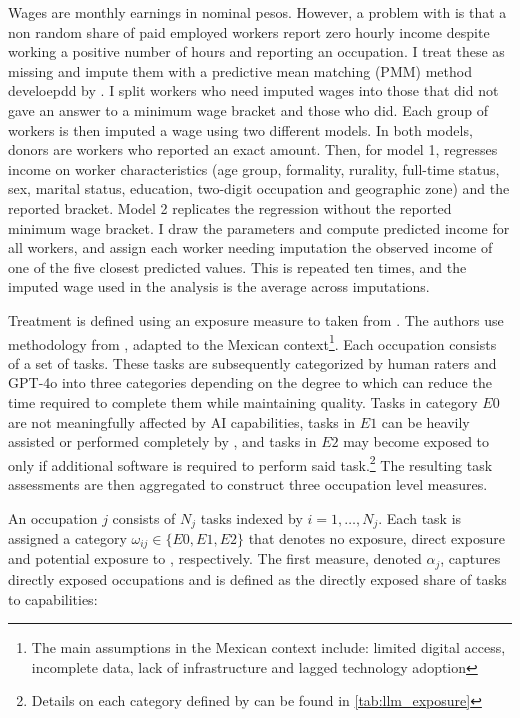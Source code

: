 Wages are monthly earnings in nominal pesos. However, a problem with  is that a non random share of paid employed workers report zero hourly income despite working a positive number of hours and reporting an occupation. \cite{imput}
I treat these as missing and impute them with a predictive mean matching (PMM) method develoepdd by \cite{conasami2023imputacion}. I split workers who need imputed wages into those that did not gave an answer to a minimum wage bracket and those who did. Each group of workers is then imputed a wage using two different models. In both models, donors are workers who reported an exact amount. Then, for model 1, regresses income on worker characteristics (age group, formality, rurality, full-time status, sex, marital status, education, two-digit occupation and geographic zone) and the reported bracket. Model 2 replicates the regression without the reported minimum wage bracket. I draw the parameters and compute predicted income for all workers, and assign each worker needing imputation the observed income of one of the five closest predicted values. This is repeated ten times, and the imputed wage used in the analysis is the average across imputations.

Treatment is defined using an exposure measure to  taken from \cite{martinez2024risk}. The authors use methodology from \cite{eloundou2023gptsgptsearlylook}, adapted to the Mexican context\footnote{The main assumptions in the Mexican context include: limited digital access, incomplete data, lack of infrastructure and lagged technology adoption}. Each occupation consists of a set of tasks. These tasks are subsequently categorized by human raters and GPT-4o into three categories depending on the degree to which  can reduce the time required to complete them while maintaining quality. Tasks in category $E0$ are not meaningfully affected by AI capabilities, tasks in $E1$ can be heavily assisted or performed completely by , and tasks in $E2$ may become exposed to  only if additional software is required to perform said task.\footnote{Details on each category defined by \cite{eloundou2023gptsgptsearlylook} can be found in \cref{tab:llm_exposure}} The resulting task assessments are then aggregated to construct three occupation level measures.

An occupation $j$ consists of $N_j$ tasks indexed by $i = 1, \ldots, N_j$. Each task is assigned a category $\omega_{ij} \in \{E0, E1, E2\}$ that denotes no exposure, direct exposure and potential exposure to , respectively. The first measure, denoted $\alpha_j$, captures directly exposed occupations and is defined as the directly exposed share of tasks to  capabilities:

